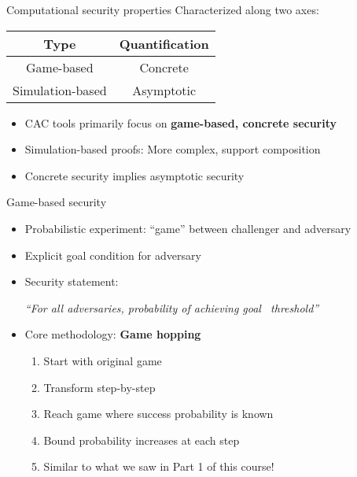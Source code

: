 \documentclass[aspectratio=169, lualatex, handout]{beamer}
\begin{document}
\begin{frame}{Computational security properties}
	Characterized along two axes:
	\vspace{1em}
	\begin{center}
		\begin{tabular}{|c|c|}
			\hline
			\textbf{Type}    & \textbf{Quantification} \\
			\hline
			Game-based       & Concrete                \\
			Simulation-based & Asymptotic              \\
			\hline
		\end{tabular}
	\end{center}
	\vspace{1em}
	\begin{itemize}
		\item CAC tools primarily focus on \textbf{game-based, concrete security}
		\item Simulation-based proofs: More complex, support composition
		\item Concrete security implies asymptotic security
	\end{itemize}
\end{frame}

\begin{frame}{Game-based security}
	\begin{itemize}
		\item Probabilistic experiment: ``game'' between challenger and adversary
		\item Explicit goal condition for adversary
		\item Security statement:
		      \begin{center}
			      \textit{``For all adversaries, probability of achieving goal \leq\ threshold''}
		      \end{center}
		\item Core methodology: \textbf{Game hopping}
		      \begin{enumerate}
			      \item Start with original game
			      \item Transform step-by-step
			      \item Reach game where success probability is known
			      \item Bound probability increases at each step
			      \item Similar to what we saw in Part 1 of this course!
		      \end{enumerate}
	\end{itemize}
\end{frame}
\end{document}

